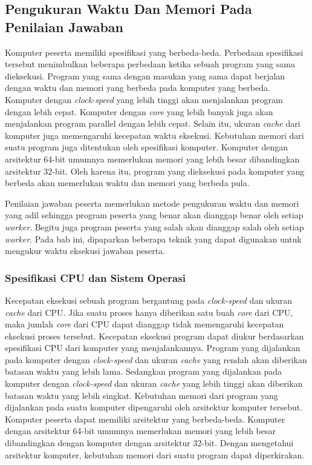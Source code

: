 \subsection{Pengukuran Waktu Dan Memori Pada Penilaian Jawaban} \label{subsec:time-memory-measure}

\par Komputer peserta memiliki spesifikasi yang berbeda-beda. Perbedaan spesifikasi tersebut menimbulkan beberapa perbedaan ketika sebuah program yang sama dieksekusi. Program yang sama dengan masukan yang sama dapat berjalan dengan waktu dan memori yang berbeda pada komputer yang berbeda. Komputer dengan \textit{clock-speed} yang lebih tinggi akan menjalankan program dengan lebih cepat. Komputer dengan \textit{core} yang lebih banyak juga akan menjalankan program parallel dengan lebih cepat. Selain itu, ukuran \textit{cache} dari komputer juga memengaruhi kecepatan waktu eksekusi. Kebutuhan memori dari suatu program juga ditentukan oleh spesifikasi komputer. Komputer dengan arsitektur 64-bit umumnya memerlukan memori yang lebih besar dibandingkan arsitektur 32-bit. Oleh karena itu, program yang dieksekusi pada komputer yang berbeda akan memerlukan waktu dan memori yang berbeda pula.

\par Penilaian jawaban peserta memerlukan metode pengukuran waktu dan memori yang adil sehingga program peserta yang benar akan dianggap benar oleh setiap \textit{worker}. Begitu juga program peserta yang salah akan dianggap salah oleh setiap \textit{worker}. Pada bab ini, dipaparkan beberapa teknik yang dapat digunakan untuk mengukur waktu eksekusi jawaban peserta.

\subsubsection{Spesifikasi CPU dan Sistem Operasi}

\par Kecepatan eksekusi sebuah program bergantung pada \textit{clock-speed} dan ukuran \textit{cache} dari CPU. Jika suatu proses hanya diberikan satu buah \textit{core} dari CPU, maka jumlah \textit{core} dari CPU dapat dianggap tidak memengaruhi kecepatan eksekusi proses tersebut. Kecepatan eksekusi program dapat diukur berdasarkan spesifikasi CPU dari komputer yang menjalankannya. Program yang dijalankan pada komputer dengan \textit{clock-speed} dan ukuran \textit{cache} yang rendah akan diberikan batasan waktu yang lebih lama. Sedangkan program yang dijalankan pada komputer dengan \textit{clock-speed} dan ukuran \textit{cache} yang lebih tinggi akan diberikan batasan waktu yang lebih singkat. Kebutuhan memori dari program yang dijalankan pada suatu komputer dipengaruhi oleh arsitektur komputer tersebut. Komputer peserta dapat memiliki arsitektur yang berbeda-beda. Komputer dengan arsitektur 64-bit umumnya memerlukan memori yang lebih besar dibandingkan dengan komputer dengan arsitektur 32-bit. Dengan mengetahui arsitektur komputer, kebutuhan memori dari suatu program dapat diperkirakan.

